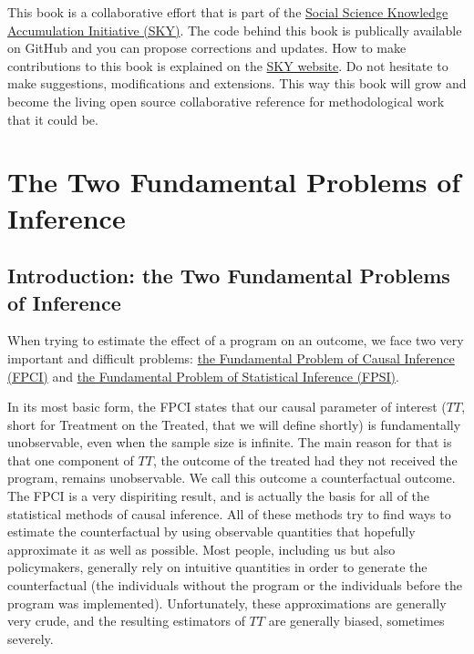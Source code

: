 \documentclass[]{book}
\theoremstyle{definition}
\theoremstyle{definition}
\theoremstyle{definition}
\theoremstyle{remark}
\begin{document}
This book is a collaborative effort that is part of the
\href{https://chabefer.github.io/SKY/}{Social Science Knowledge
Accumulation Initiative (SKY)}. The code behind this book is publically
available on GitHub and you can propose corrections and updates. How to
make contributions to this book is explained on the
\href{https://chabefer.github.io/SKY/tutoSTCI.html}{SKY website}. Do not
hesitate to make suggestions, modifications and extensions. This way
this book will grow and become the living open source collaborative
reference for methodological work that it could be.

\part{The Two Fundamental Problems of
Inference}\label{part-the-two-fundamental-problems-of-inference}

\chapter*{Introduction: the Two Fundamental Problems of
Inference}\label{introduction-the-two-fundamental-problems-of-inference}

When trying to estimate the effect of a program on an outcome, we face
two very important and difficult problems: \href{FPCI.html}{the
Fundamental Problem of Causal Inference (FPCI)} and \href{FPSI.html}{the
Fundamental Problem of Statistical Inference (FPSI)}.

In its most basic form, the FPCI states that our causal parameter of
interest (\(TT\), short for Treatment on the Treated, that we will
define shortly) is fundamentally unobservable, even when the sample size
is infinite. The main reason for that is that one component of \(TT\),
the outcome of the treated had they not received the program, remains
unobservable. We call this outcome a counterfactual outcome. The FPCI is
a very dispiriting result, and is actually the basis for all of the
statistical methods of causal inference. All of these methods try to
find ways to estimate the counterfactual by using observable quantities
that hopefully approximate it as well as possible. Most people,
including us but also policymakers, generally rely on intuitive
quantities in order to generate the counterfactual (the individuals
without the program or the individuals before the program was
implemented). Unfortunately, these approximations are generally very
crude, and the resulting estimators of \(TT\) are generally biased,
sometimes severely.
\end{document}
